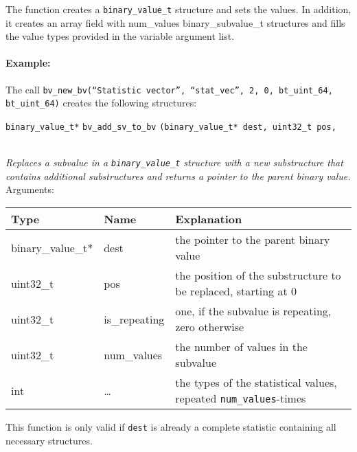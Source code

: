 \documentclass[documentation]{subfiles}
\begin{document}
The function creates a {\tt binary\_value\_t} structure and sets the values. In addition, it creates an array field with num\_values binary\_subvalue\_t structures and fills the value types provided in the variable argument list.

\paragraph{Example:} The call {\tt bv\_new\_bv(``Statistic vector'', ``stat\_vec'', 2, 0, bt\_uint\_64, bt\_uint\_64)} creates the following structures:
\begin{figure}[H]
    \centering
\end{figure}
\vspace{18pt}
\begin{tabbing}
\={\tt binary\_value\_t*} \= {\tt bv\_add\_sv\_to\_bv} \={\tt(binary\_value\_t* dest, uint32\_t pos,}\\
\>\> \\
\end{tabbing}
{\em Replaces a subvalue in a {\tt binary\_value\_t} structure with a new substructure that contains additional substructures and returns a pointer to the parent binary value.}\\[2ex]
Arguments:
\begin{longtable}{lll}
    \toprule
    {\bf Type} & {\bf Name} & {\bf Explanation} \\
    \midrule\endhead%
    binary\_value\_t* & dest & the pointer to the parent binary value \\
    uint32\_t & pos & the position of the substructure to be replaced, starting at 0 \\
    uint32\_t & is\_repeating & one, if the subvalue is repeating, zero otherwise \\
    uint32\_t & num\_values & the number of values in the subvalue \\
    int & \ldots & the types of the statistical values, repeated {\tt num\_values}-times \\
    \bottomrule
\end{longtable}
This function is only valid if {\tt dest} is already a complete statistic containing all necessary structures.
\end{document}
